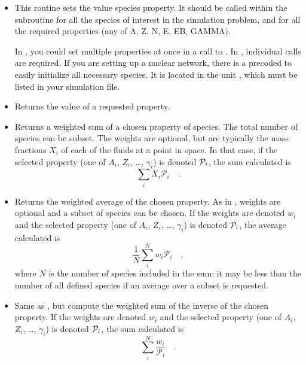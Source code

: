 \begin{itemize}

\item {}
This routine sets the value species property.  It should be called within the subroutine
 for all the species of interest in the
simulation problem, and for all the required properties (any of A, Z, N, E, EB, GAMMA).
\begin{flashtip}
In \flashx, you could set multiple properties at once in a call to .
In \flashx, individual calls are required.  If you are setting up a nuclear network, there
is a precoded  to easily initialize all necessary species.
It is located in the unit ,
which must be listed in your simulation  file.
\end{flashtip}

\item {}
Returns the value of a requested property.

\item {}
Returns a weighted sum of a chosen property of species.
The total number of species can be subset.
The weights are optional, but are typically the mass
fractions $X_i$ of each of the fluids at a point in space.
In that case, if the selected property
(one of
$A_i$, $Z_i$, \ldots, $\gamma_i$)
is denoted ${\cal{P}}_i$,
the sum calculated is
\[
\sum_i {X_i}{\mathcal{P}_i} \quad.
\]

\item \frenchspacing {}
Returns
the weighted average of the chosen property. As in
, weights are optional and a subset of species can be chosen.
If the weights are denoted $w_i$
and the selected property
(one of
$A_i$, $Z_i$, \ldots, $\gamma_i$)
is denoted ${\cal{P}}_i$,
the average calculated is
\[
\frac{1}{N} \sum_i^N {w_i}{\mathcal{P}_i} \quad,
\]
where $N$ is the number of species included in the sum; it may be less than the number of all
defined species
if an average over a subset is requested.

\item {}
Same as , but compute
the weighted sum of the inverse of the chosen property.
If the weights are denoted $w_i$
and the selected property
(one of
$A_i$, $Z_i$, \ldots, $\gamma_i$)
is denoted ${\cal{P}}_i$,
the sum calculated is
\[
\sum_i^N \frac{w_i}{\mathcal{P}_i} \quad.
\]



\end{itemize}
